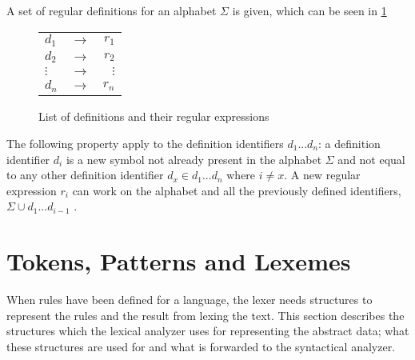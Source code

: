A set of regular definitions for an alphabet $\Sigma$ is given, which can be
seen in \cref{fig:regularDefinitions}

\begin{figure}[hb!]
\begin{center}
\begin{tabular}{l c r}
$d_1$ & $\to$ & $r_1$\\
$d_2$ & $\to$ & $r_2$\\
$\vdots$ & $\to$ & $\vdots$\\
$d_n$ & $\to$ & $r_n$\\
\end{tabular}
\caption{List of definitions and their regular expressions \label{fig:regularDefinitions}}
\end{center}
\end{figure}

The following property apply to the definition identifiers $d_1 ... d_n$: a
definition identifier $d_i$ is a new symbol not already present in the alphabet
$\Sigma$ and not equal to any other definition identifier
$d_x \in {d_1 ... d_n}$ where $i \neq x$. A new regular expression $r_i$ can work
on the alphabet and all the previously defined identifiers,
$\Sigma \cup {d_1 ... d_{i-1}}$ \cite{Aho2006}.


\section{Tokens, Patterns and Lexemes}
When rules have been defined for a language, the lexer needs structures to
represent the rules and the result from lexing the text.
This section describes the structures which the lexical analyzer uses
for representing the abstract data; what these structures are used for and what is
forwarded to the syntactical analyzer.

